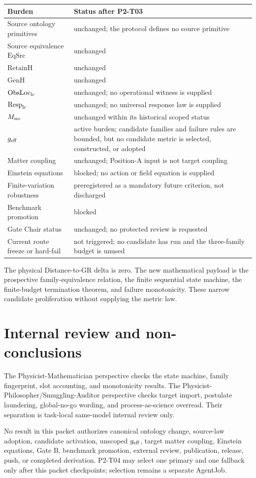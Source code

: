 \documentclass[11pt]{article}
\begin{document}
\begin{longtable}{p{}p{}}
\toprule
Burden & Status after P2-T03\\
\midrule
Source ontology primitives & unchanged; the protocol defines no source primitive\\
Source equivalence $\mathrm{EqSrc}$ & unchanged\\
$\mathrm{RetainH}$ & unchanged\\
$\mathrm{GenH}$ & unchanged\\
$\mathrm{ObsLoc}_{\rm lc}$ & unchanged; no operational witness is supplied\\
$\mathrm{Resp}_{\rm lc}$ & unchanged; no universal response law is supplied\\
$M_{\rm src}$ & unchanged within its historical scoped status\\
$g_{\rm eff}$ & active burden; candidate families and failure rules are bounded,
but no candidate metric is selected, constructed, or adopted\\
Matter coupling & unchanged; Position-A input is not target coupling\\
Einstein equations & blocked; no action or field equation is supplied\\
Finite-variation robustness & preregistered as a mandatory future criterion,
not discharged\\
Benchmark promotion & blocked\\
Gate Chair status & unchanged; no protected review is requested\\
Current route freeze or hard-fail & not triggered; no candidate has run and the
three-family budget is unused\\
\bottomrule
\end{longtable}

The physical Distance-to-GR delta is zero. The new mathematical payload is the
prospective family-equivalence relation, the finite sequential state machine,
the finite-budget termination theorem, and failure monotonicity. These narrow
candidate proliferation without supplying the metric law.

\section{Internal review and non-conclusions}

The Physicist-Mathematician perspective checks the state machine, family
fingerprint, slot accounting, and monotonicity results. The
Physicist-Philosopher/Smuggling-Auditor perspective checks target import,
postulate laundering, global-no-go wording, and process-as-science overread.
Their separation is task-local same-model internal review only.

No result in this packet authorizes canonical ontology change, source-law
adoption, candidate activation, unscoped $g_{\rm eff}$, target matter coupling,
Einstein equations, Gate B, benchmark promotion, external review, publication,
release, push, or completed derivation. P2-T04 may select one primary and one fallback only after this packet checkpoints; selection remains a separate
AgentJob.
\end{document}
